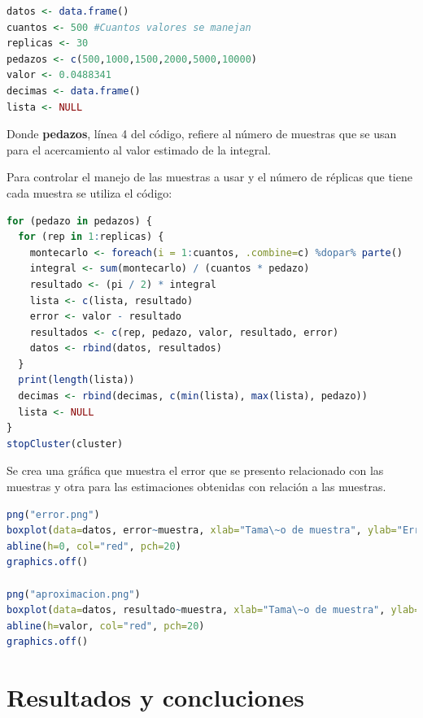 \documentclass{article}
\begin{document}
\begin{lstlisting}[language=R]
datos <- data.frame()
cuantos <- 500 #Cuantos valores se manejan
replicas <- 30
pedazos <- c(500,1000,1500,2000,5000,10000)
valor <- 0.0488341
decimas <- data.frame()
lista <- NULL
\end{lstlisting}

Donde \textbf{pedazos}, l\'inea 4 del c\'odigo, refiere al n\'umero de muestras que se usan para el acercamiento al valor estimado de la integral.

Para controlar el manejo de las muestras a usar y el n\'umero de r\'eplicas que tiene cada muestra se utiliza el c\'odigo:

\begin{lstlisting}[language=R]
for (pedazo in pedazos) {
  for (rep in 1:replicas) {
    montecarlo <- foreach(i = 1:cuantos, .combine=c) %dopar% parte()
    integral <- sum(montecarlo) / (cuantos * pedazo)
    resultado <- (pi / 2) * integral
    lista <- c(lista, resultado)
    error <- valor - resultado
    resultados <- c(rep, pedazo, valor, resultado, error)
    datos <- rbind(datos, resultados)
  }
  print(length(lista))
  decimas <- rbind(decimas, c(min(lista), max(lista), pedazo))
  lista <- NULL
}
stopCluster(cluster)
\end{lstlisting}

Se crea una gr\'afica que muestra el error que se presento relacionado con las muestras y otra para las estimaciones obtenidas con relaci\'on a las muestras.

\begin{lstlisting}[language=R]
png("error.png")
boxplot(data=datos, error~muestra, xlab="Tama\~o de muestra", ylab="Error", main="", col = "orange")
abline(h=0, col="red", pch=20)
graphics.off()

png("aproximacion.png")
boxplot(data=datos, resultado~muestra, xlab="Tama\~o de muestra", ylab="Resultados", main="", col = "blue")
abline(h=valor, col="red", pch=20)
graphics.off()
\end{lstlisting}

\newpage

\section{Resultados y concluciones}
\end{document}
